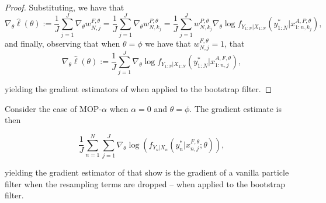 \documentclass{article}
\begin{document}
\begin{proof}
Substituting, we have that
\begin{equation*}
    \nabla_\theta \hat{\ell}(\theta) := \frac{1}{J}\sum_{j=1}^J \nabla_\theta w_{N,j}^{F,\theta} =\frac{1}{J}\sum_{j=1}^J \nabla_\theta w_{N,k_j}^{P,\theta} = \frac{1}{J}\sum_{j=1}^J w_{N,k_j}^{P,\theta} \nabla_\theta \log f_{Y_{1:N}|X_{1:N}}\left(y_{1:N}^* | x_{1:n,k_j}^{A, P,\theta}\right),
\end{equation*}
and finally, observing that when $\theta=\phi$ we have that $w_{N,j}^{F,\theta}=1$, that 
\begin{equation*}
    \nabla_\theta \hat{\ell}(\theta) := \frac{1}{J}\sum_{j=1}^J \nabla_\theta \log f_{Y_{1:N}|X_{1:N}}\left(y_{1:N}^* | x_{1:n,j}^{A, F,\theta}\right),
\end{equation*}

yielding the gradient estimators of \cite{poyiadjis11, scibior2021dpf} when applied to the bootstrap filter. 
\end{proof}

\begin{lem}

Consider the case of MOP-$\alpha$ when $\alpha=0$ and $\theta=\phi$. The gradient estimate is then

    \begin{equation}
        \frac{1}{J} \sum_{n=1}^N \sum_{j=1}^J \nabla_\theta \log\left(f_{Y_n|X_{n}}(y_n^*|x_{n,j}^{F, \theta}; \theta)\right),
    \end{equation}

    yielding the gradient estimator of \cite{blei2018vsmc} that \cite{scibior2021dpf} show is the gradient of a vanilla particle filter when the resampling terms are dropped -- when applied to the bootstrap filter.

\end{lem}
\end{document}
